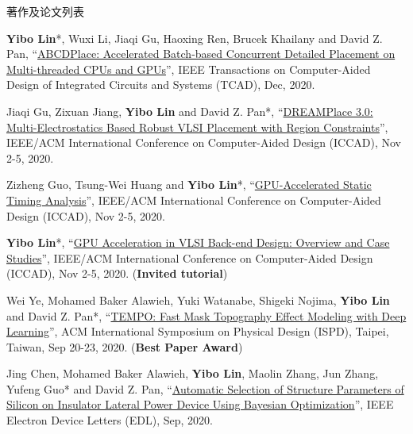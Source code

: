 \begin{rSection}{著作及论文列表}
\begin{description}[font=\normalfont, rightmargin=2em]
\item[{[J63]}]{
        \textbf{Yibo Lin}*, Wuxi Li, Jiaqi Gu, Haoxing Ren, Brucek Khailany and David Z. Pan, 
    ``\href{https://doi.org/10.1109/TCAD.2020.2971531}{ABCDPlace: Accelerated Batch-based Concurrent Detailed Placement on Multi-threaded CPUs and GPUs}'', 
    IEEE Transactions on Computer-Aided Design of Integrated Circuits and Systems (TCAD), Dec, 2020.
    
}
            

\item[{[C62]}]{
        Jiaqi Gu, Zixuan Jiang, \textbf{Yibo Lin} and David Z. Pan*, 
    ``\href{https://doi.org/10.1145/3400302.3415691}{DREAMPlace 3.0: Multi-Electrostatics Based Robust VLSI Placement with Region Constraints}'', 
    IEEE/ACM International Conference on Computer-Aided Design (ICCAD), Nov 2-5, 2020.
    
}
            

\item[{[C61]}]{
        Zizheng Guo, Tsung-Wei Huang and \textbf{Yibo Lin}*, 
    ``\href{https://doi.org/10.1145/3400302.3415631}{GPU-Accelerated Static Timing Analysis}'', 
    IEEE/ACM International Conference on Computer-Aided Design (ICCAD), Nov 2-5, 2020.
    
}
            

\item[{[C60]}]{
        \textbf{Yibo Lin}*, 
    ``\href{https://doi.org/10.1145/3400302.3415765}{GPU Acceleration in VLSI Back-end Design: Overview and Case Studies}'', 
    IEEE/ACM International Conference on Computer-Aided Design (ICCAD), Nov 2-5, 2020.
    (\textbf{Invited tutorial})
}
            

\item[{[C59]}]{
        Wei Ye, Mohamed Baker Alawieh, Yuki Watanabe, Shigeki Nojima, \textbf{Yibo Lin} and David Z. Pan*, 
    ``\href{https://doi.org/10.1145/3372780.3375565}{TEMPO: Fast Mask Topography Effect Modeling with Deep Learning}'', 
    ACM International Symposium on Physical Design (ISPD), Taipei, Taiwan, Sep 20-23, 2020.
    (\textbf{Best Paper Award})
}
            

\item[{[J58]}]{
        Jing Chen, Mohamed Baker Alawieh, \textbf{Yibo Lin}, Maolin Zhang, Jun Zhang, Yufeng Guo* and David Z. Pan, 
    ``\href{https://doi.org/10.1109/LED.2020.3013571}{Automatic Selection of Structure Parameters of Silicon on Insulator Lateral Power Device Using Bayesian Optimization}'', 
    IEEE Electron Device Letters (EDL), Sep, 2020.
    
}
\end{description}
\end{rSection}
